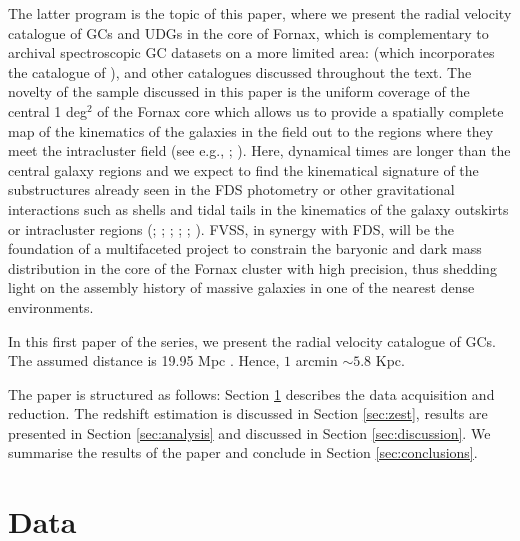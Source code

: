 \documentclass[useAMS,usenatbib]{mn2e}
\begin{document}
The latter program is the topic of this paper, where we present the radial 
velocity catalogue of GCs and UDGs in the core of Fornax, which is 
complementary to archival spectroscopic GC datasets on a more limited area: 
\citet{Schuberth} (which incorporates the catalogue of \citealt{Dirsch04}), 
\citet{Bergond07} and other catalogues discussed throughout the 
text. The novelty of the sample discussed in this paper is the uniform coverage 
of the central 1 deg$^2$ of the Fornax core which allows us to provide a 
spatially complete map of the kinematics of the galaxies in the field out to 
the regions where they meet the intracluster field (see e.g., \citealt{napolitano03}
; \citealt{arnaboldi12}). Here, dynamical times are longer than the central 
galaxy regions and we expect to find the kinematical signature of the 
substructures already seen in the FDS photometry \citep{Iodice16} or other 
gravitational interactions such as shells and tidal tails in the kinematics of 
the galaxy outskirts or intracluster regions (\citealt{napolitano02,napolitano03}; 
\citealt{murante07}; \citealt{bullock05}; \citealt{rudick06}; 
\citealt{duc11}; \citealt{Longobardi15}). FVSS, in synergy with FDS, will be 
the foundation of a multifaceted project to constrain the baryonic and dark 
mass distribution in the core of the Fornax cluster with high precision, thus 
shedding light on the assembly history of massive galaxies in one of the 
nearest dense environments.

In this first paper of the series, we present the radial velocity catalogue of 
GCs. 
The assumed distance is 19.95 Mpc \citep{Tonry01}. Hence, $1$ arcmin $\sim 5.8$ Kpc.

The paper is structured as follows: Section \ref{sec:data} describes the data 
acquisition and reduction. The redshift estimation is discussed in Section 
\ref{sec:zest}, results are presented in Section \ref{sec:analysis} and 
discussed in Section \ref{sec:discussion}. We summarise the results of the paper and 
conclude in Section \ref{sec:conclusions}. 

\section{Data}
\label{sec:data}
\end{document}
